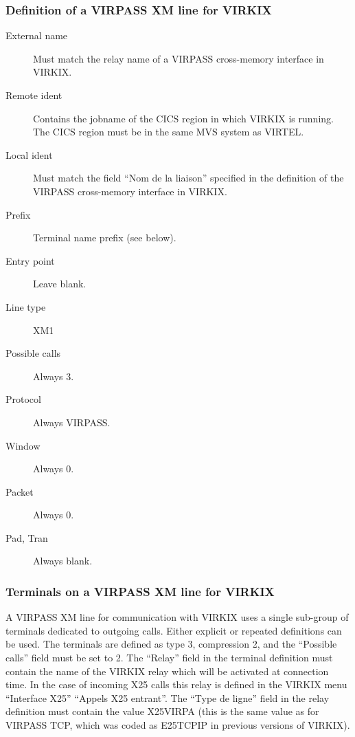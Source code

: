 \documentclass[letterpaper,10pt,english]{sphinxmanual}
\begin{document}
\subsubsection{Definition of a VIRPASS XM line for VIRKIX}
\label{\detokenize{connectivity_guide:definition-of-a-virpass-xm-line-for-virkix}}\begin{description}
\item[{External name}] \leavevmode
Must match the relay name of a VIRPASS cross-memory interface in VIRKIX.

\item[{Remote ident}] \leavevmode
Contains the jobname of the CICS region in which VIRKIX is running.
The CICS region must be in the same MVS system as VIRTEL.

\item[{Local ident}] \leavevmode
Must match the field “Nom de la liaison” specified in the definition
of the VIRPASS cross-memory interface in VIRKIX.

\item[{Prefix}] \leavevmode
Terminal name prefix (see below).

\item[{Entry point}] \leavevmode
Leave blank.

\item[{Line type}] \leavevmode
XM1

\item[{Possible calls}] \leavevmode
Always 3.

\item[{Protocol}] \leavevmode
Always VIRPASS.

\item[{Window}] \leavevmode
Always 0.

\item[{Packet}] \leavevmode
Always 0.

\item[{Pad, Tran}] \leavevmode
Always blank.

\end{description}


\subsubsection{Terminals on a VIRPASS XM line for VIRKIX}
\label{\detokenize{connectivity_guide:terminals-on-a-virpass-xm-line-for-virkix}}
A VIRPASS XM line for communication with VIRKIX uses a single sub-group of terminals dedicated to outgoing calls. Either explicit or repeated definitions can be used. The terminals are defined as type 3, compression 2, and the “Possible calls” field must be set to 2. The “Relay” field in the terminal definition must contain the name of the VIRKIX relay which will be activated at connection time. In the case of incoming X25 calls this relay is defined in the VIRKIX menu “Interface X25” \textendash{} “Appels X25 entrant”. The “Type de ligne” field in the relay definition must contain the value X25VIRPA (this is the same value as for VIRPASS TCP, which was coded as E25TCPIP in previous versions of VIRKIX).
\end{document}
